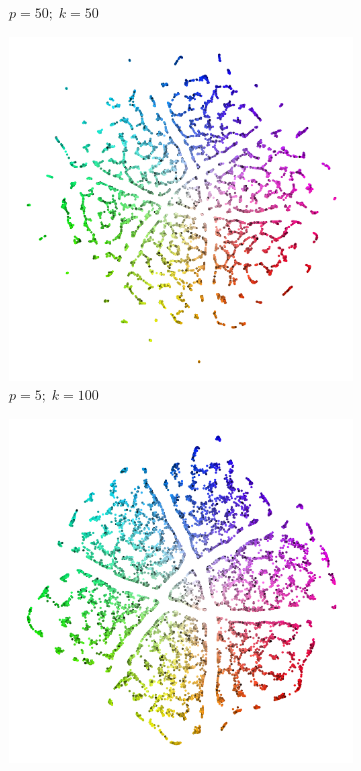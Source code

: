 \begin{figure}[!p]
\begin{subfigure}{0.3\linewidth}
    \caption{$p = 50;\; k = 50$}
\end{subfigure}
\par\bigskip
  \begin{subfigure}{0.3\linewidth}
    \centering
    \includegraphics[width=\linewidth]{img/ktsne_color_n_10000_embedding_eta_200_p_5_l_100_crosspolytope_k_100_K_100_pca_x_12_X_1_s_666-1}
    \caption{$p = 5;\; k = 100$}
  \end{subfigure}
\begin{subfigure}{0.3\linewidth}
  \centering
    \includegraphics[width=\linewidth]{img/ktsne_color_n_10000_embedding_eta_200_p_25_l_100_crosspolytope_k_100_K_100_pca_x_12_X_1_s_666-1}

\end{subfigure}
\end{figure}
